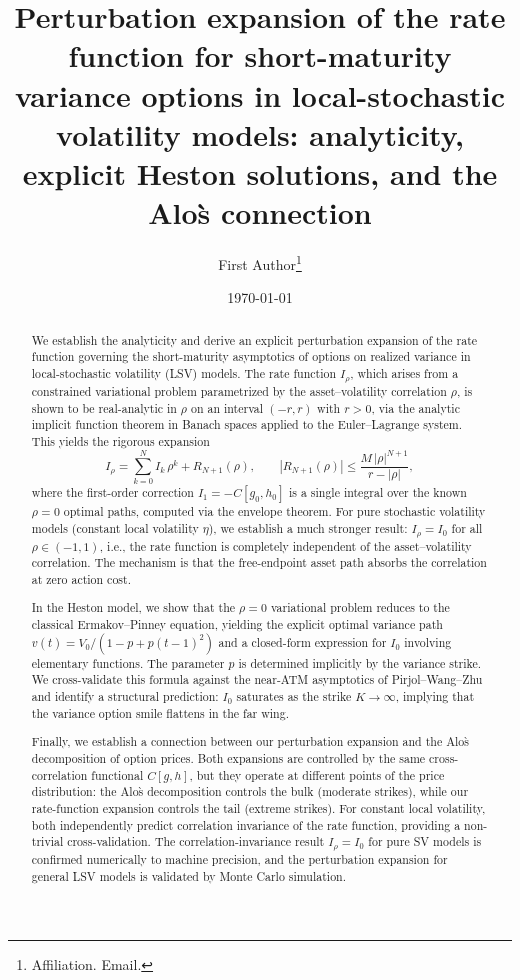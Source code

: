 \documentclass[11pt]{article}
\title{Perturbation expansion of the rate function for short-maturity variance options in local-stochastic volatility models: analyticity, explicit Heston solutions, and the Alo\`s connection}
\author{
  First Author\thanks{Affiliation. Email.}
}
\date{\today}
\theoremstyle{definition}
\begin{document}
\maketitle

\begin{abstract}
We establish the analyticity and derive an explicit perturbation expansion of the rate function governing the short-maturity asymptotics of options on realized variance in local-stochastic volatility (LSV) models. The rate function $I_\rho$, which arises from a constrained variational problem parametrized by the asset--volatility correlation $\rho$, is shown to be real-analytic in $\rho$ on an interval $(-r,r)$ with $r>0$, via the analytic implicit function theorem in Banach spaces applied to the Euler--Lagrange system. This yields the rigorous expansion
\[
  I_\rho = \sum_{k=0}^{N} I_k\,\rho^k + R_{N+1}(\rho), \qquad
  |R_{N+1}(\rho)| \leq \frac{M\,|\rho|^{N+1}}{r - |\rho|},
\]
where the first-order correction $I_1 = -C[g_0,h_0]$ is a single integral over the known $\rho=0$ optimal paths, computed via the envelope theorem. For pure stochastic volatility models (constant local volatility $\eta$), we establish a much stronger result: $I_\rho = I_0$ for all $\rho \in (-1,1)$, i.e., the rate function is completely independent of the asset--volatility correlation. The mechanism is that the free-endpoint asset path absorbs the correlation at zero action cost.

In the Heston model, we show that the $\rho=0$ variational problem reduces to the classical Ermakov--Pinney equation, yielding the explicit optimal variance path $v(t) = V_0/(1 - p + p(t-1)^2)$ and a closed-form expression for $I_0$ involving elementary functions. The parameter $p$ is determined implicitly by the variance strike. We cross-validate this formula against the near-ATM asymptotics of Pirjol--Wang--Zhu and identify a structural prediction: $I_0$ saturates as the strike $K\to\infty$, implying that the variance option smile flattens in the far wing.

Finally, we establish a connection between our perturbation expansion and the Alo\`s decomposition of option prices. Both expansions are controlled by the same cross-correlation functional $C[g,h]$, but they operate at different points of the price distribution: the Alo\`s decomposition controls the bulk (moderate strikes), while our rate-function expansion controls the tail (extreme strikes). For constant local volatility, both independently predict correlation invariance of the rate function, providing a non-trivial cross-validation. The correlation-invariance result $I_\rho = I_0$ for pure SV models is confirmed numerically to machine precision, and the perturbation expansion for general LSV models is validated by Monte Carlo simulation.
\end{abstract}
\end{document}
